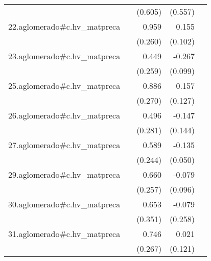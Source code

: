 {\begin{longtable}{l*{4}{D{.}{.}{-1}}}
            &                     &     (0.605)         &     (0.557)         &                     \\
\addlinespace
22.aglomerado#c.hv\_matpreca&                     &       0.959\sym{***}&       0.155         &                     \\
            &                     &     (0.260)         &     (0.102)         &                     \\
\addlinespace
23.aglomerado#c.hv\_matpreca&                     &       0.449         &      -0.267\sym{**} &                     \\
            &                     &     (0.259)         &     (0.099)         &                     \\
\addlinespace
25.aglomerado#c.hv\_matpreca&                     &       0.886\sym{**} &       0.157         &                     \\
            &                     &     (0.270)         &     (0.127)         &                     \\
\addlinespace
26.aglomerado#c.hv\_matpreca&                     &       0.496         &      -0.147         &                     \\
            &                     &     (0.281)         &     (0.144)         &                     \\
\addlinespace
27.aglomerado#c.hv\_matpreca&                     &       0.589\sym{*}  &      -0.135\sym{**} &                     \\
            &                     &     (0.244)         &     (0.050)         &                     \\
\addlinespace
29.aglomerado#c.hv\_matpreca&                     &       0.660\sym{*}  &      -0.079         &                     \\
            &                     &     (0.257)         &     (0.096)         &                     \\
\addlinespace
30.aglomerado#c.hv\_matpreca&                     &       0.653         &      -0.079         &                     \\
            &                     &     (0.351)         &     (0.258)         &                     \\
\addlinespace
31.aglomerado#c.hv\_matpreca&                     &       0.746\sym{**} &       0.021         &                     \\
            &                     &     (0.267)         &     (0.121)         &                     \\

\end{longtable}}
